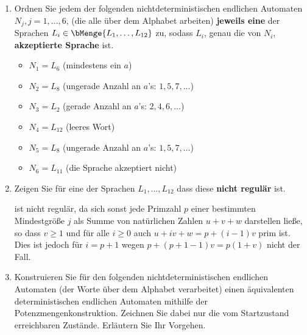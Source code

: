 \documentclass{bschlangaul-aufgabe}
\begin{document}
\begin{enumerate}

\item Ordnen Sie jedem der folgenden nichtdeterministischen endlichen
Automaten $N_j, j = 1,\dots,6$, (die alle über dem Alphabet
 arbeiten) \textbf{jeweils eine} der Sprachen $L_i \in
\bMenge{L_1, \dots , L_{12}}$ zu, sodass $L_i$, genau die von $N_i$,
\textbf{akzeptierte Sprache} ist.

\begin{bAntwort}
\begin{itemize}
\item $N_1 = L_6$ (mindestens ein $a$)

\item $N_2 = L_8$ (ungerade Anzahl an $a$’s: $1, 5, 7, \dots$)

\item $N_3 = L_2$ (gerade Anzahl an $a$’s: $2, 4, 6, \dots$)

\item $N_4 = L_{12}$ (leeres Wort)

\item $N_5 = L_8$ (ungerade Anzahl an $a$’s: $1, 5, 7, \dots$)

\item $N_6 = L_{11}$ (die Sprache akzeptiert nicht)
\end{itemize}
\end{bAntwort}


\item Zeigen Sie für eine der Sprachen $L_1, \dots, L_{12}$ dass diese
\textbf{nicht regulär} ist.

\begin{bAntwort}

ist nicht regulär, da sich sonst jede Primzahl $p$ einer bestimmten
Mindestgröße $j$ als Summe von natürlichen Zahlen $u + v + w$ darstellen
ließe, so dass $v \geq 1$ und für alle $i \geq 0$ auch $u + iv + w = p +
(i − 1)v$ prim ist. Dies ist jedoch für $i = p + 1$ wegen $p + (p + 1 −
1)v = p(1 + v)$ nicht der
Fall.
\end{bAntwort}


\item Konstruieren Sie für den folgenden nichtdeterministischen
endlichen Automaten (der Worte über dem Alphabet 
verarbeitet) einen äquivalenten deterministischen endlichen Automaten
mithilfe der Potenzmengenkonstruktion. Zeichnen Sie dabei nur die vom
Startzustand erreichbaren Zustände. Erläutern Sie Ihr Vorgehen.


\end{enumerate}
\end{document}
